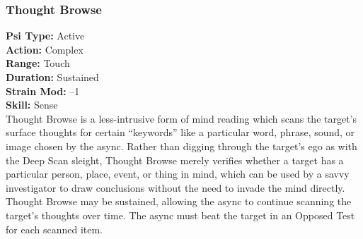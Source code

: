 \subsubsection{Thought Browse} \textbf{Psi Type:} Active \\ \textbf{Action:} Complex \\ \textbf{Range:} Touch \\ \textbf{Duration:} Sustained \\ \textbf{Strain Mod:} –1 \\ \textbf{Skill:} Sense\\ Thought Browse is a less-intrusive form of mind reading which scans the target’s surface thoughts for certain “keywords” like a particular word, phrase, sound, or image chosen by the async. Rather than digging through the target’s ego as with the Deep Scan sleight, Thought Browse merely verifies whether a target has a particular person, place, event, or thing in mind, which can be used by a savvy investigator to draw conclusions without the need to invade the mind directly. Thought Browse may be sustained, allowing the async to continue scanning the target’s thoughts over time. The async must beat the target in an Opposed Test for each scanned item. 


